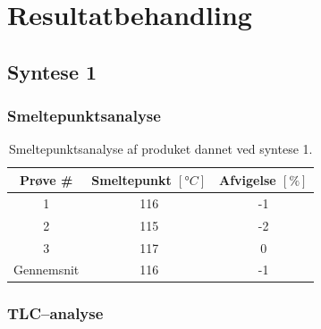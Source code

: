 \section{Resultatbehandling}
    
    \subsection{Syntese 1}
    \subsubsection{Smeltepunktsanalyse}
    \begin{table}[H]\centering
        \begin{tabular}{ccc}
                \toprule
                Prøve # & Smeltepunkt $\left[\si{\degree C}\right]$ & Afvigelse $\left[\%\right]$ \\
                \midrule
                1 & 116 & -1 \\
                2 & 115 & -2 \\
                3 & 117 & 0 \\
                \midrule
                Gennemsnit & 116 & -1 \\
                \bottomrule
            \end{tabular}
        \caption{Smeltepunktsanalyse af produket dannet ved syntese 1.}
    \end{table}

    \subsubsection{TLC--analyse}
    
    \begin{table}[H]\centering
        \caption{TLC--analyse af propylparaben dannet ved syntese 3.}
    \end{table}

